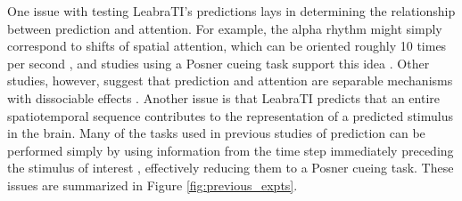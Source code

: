 \documentclass[12pt]{article}
\begin{document}
One issue with testing LeabraTI's predictions lays in determining the relationship between prediction and attention. For example, the alpha rhythm might simply correspond to shifts of spatial attention, which can be oriented roughly 10 times per second \cite{VanRullenDubois11}, and studies using a Posner cueing task \cite{Posner80} support this idea \cite[e.g.,]{CapotostoBabiloniRomaniEtAl09,BuschVanRullen10}. Other studies, however, suggest that prediction and attention are  separable mechanisms with dissociable effects \cite{KokRahnevJeheeEtAl12,WyartNobreSummerfield12,ArnalGiraud12,HorschigJensenVanSchouwenburgEtAl13}. Another issue is that LeabraTI predicts that an entire spatiotemporal sequence contributes to the representation of a predicted stimulus in the brain. Many of the tasks used in previous studies of prediction can be performed simply by using information from the time step immediately preceding the stimulus of interest \cite{DohertyRaoMesulamEtAl05,RohenkohlNobre11}, effectively reducing them to a Posner cueing task. These issues are summarized in Figure \ref{fig:previous_expts}.
\end{document}
